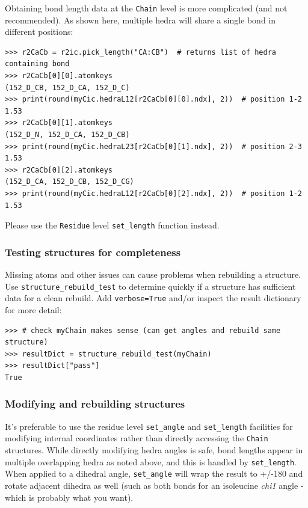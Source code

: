 Obtaining bond length data at the \texttt{Chain} level is more complicated (and
not recommended).  As shown here, multiple hedra will share a single bond in different
positions:

\begin{verbatim}
>>> r2CaCb = r2ic.pick_length("CA:CB")  # returns list of hedra containing bond
>>> r2CaCb[0][0].atomkeys
(152_D_CB, 152_D_CA, 152_D_C)
>>> print(round(myCic.hedraL12[r2CaCb[0][0].ndx], 2))  # position 1-2
1.53
>>> r2CaCb[0][1].atomkeys
(152_D_N, 152_D_CA, 152_D_CB)
>>> print(round(myCic.hedraL23[r2CaCb[0][1].ndx], 2))  # position 2-3
1.53
>>> r2CaCb[0][2].atomkeys
(152_D_CA, 152_D_CB, 152_D_CG)
>>> print(round(myCic.hedraL12[r2CaCb[0][2].ndx], 2))  # position 1-2
1.53
\end{verbatim}

Please use the \texttt{Residue} level \texttt{set\_length\(\)}
function instead.

\subsubsection{Testing structures for completeness}

Missing atoms and other issues can cause problems when rebuilding a structure.  Use
\texttt{structure\_rebuild\_test\(\)} to determine quickly if a structure has sufficient
data for a clean rebuild.  Add \texttt{verbose=True} and/or inspect the result dictionary
for more detail:

\begin{verbatim}
>>> # check myChain makes sense (can get angles and rebuild same structure)
>>> resultDict = structure_rebuild_test(myChain)
>>> resultDict["pass"]
True
\end{verbatim}

\subsubsection{Modifying and rebuilding structures}

It's preferable to use the residue level \texttt{set\_angle\(\)} and \texttt{set\_length\(\)}
facilities for modifying internal coordinates rather than directly accessing the \texttt{Chain}
structures.  While directly modifying hedra angles is safe, bond lengths appear in multiple
overlapping hedra as noted above, and this is handled by \texttt{set\_length\(\)}.  When applied
to a dihedral angle, \texttt{set\_angle\(\)} will wrap the result to +/-180 and rotate adjacent
dihedra as well (such as both bonds for an isoleucine \textit{chi1} angle - which is probably
what you want).

